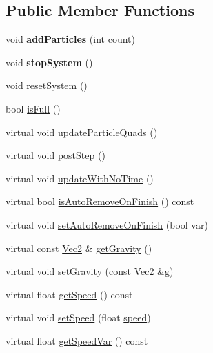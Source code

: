 \subsection*{Public Member Functions}
\begin{DoxyCompactItemize}
\item 
\mbox{\label{classParticleSystem_a44c0e75a279680bd7575352f4ae2d400}} 
void {\bfseries add\+Particles} (int count)
\item 
\mbox{\label{classParticleSystem_ae818b81f78ec0ecfa232efe532b83a36}} 
void {\bfseries stop\+System} ()
\item 
void \hyperlink{classParticleSystem_a54f9c6da030873853af3f97dc745e68f}{reset\+System} ()
\item 
bool \hyperlink{classParticleSystem_a7f2ed7b7b7a0d5a078ac8df3c1503e47}{is\+Full} ()
\item 
virtual void \hyperlink{classParticleSystem_a77929b8f9b3aca5d81362d3c3d80e378}{update\+Particle\+Quads} ()
\item 
virtual void \hyperlink{classParticleSystem_a95e820b4193a63ba26d0995224458744}{post\+Step} ()
\item 
virtual void \hyperlink{classParticleSystem_a5196d40cc09eb4899dce1e06d28f0a1c}{update\+With\+No\+Time} ()
\item 
virtual bool \hyperlink{classParticleSystem_afb3b1fc509f840948e532012f3a5a98a}{is\+Auto\+Remove\+On\+Finish} () const
\item 
virtual void \hyperlink{classParticleSystem_a08e81c9abf3433d44d1e75a4f7adae52}{set\+Auto\+Remove\+On\+Finish} (bool var)
\item 
virtual const \hyperlink{classVec2}{Vec2} \& \hyperlink{classParticleSystem_a3c2fe41cd65f652cf7d81740c6f9faf1}{get\+Gravity} ()
\item 
virtual void \hyperlink{classParticleSystem_a0a54c75d4db91c5b6ab880c28b8461f2}{set\+Gravity} (const \hyperlink{classVec2}{Vec2} \&g)
\item 
virtual float \hyperlink{classParticleSystem_a1e67cf5209cc913b92e83fe676685307}{get\+Speed} () const
\item 
virtual void \hyperlink{classParticleSystem_af0cf94eabd9a698a38294e46df7a5058}{set\+Speed} (float \hyperlink{classParticleSystem_a1a4bba0d174d86e0a941b71c1d485b50}{speed})
\item 
virtual float \hyperlink{classParticleSystem_a1cc750129c3dbec9c5b4c7d441a32fec}{get\+Speed\+Var} () const

\end{DoxyCompactItemize}

